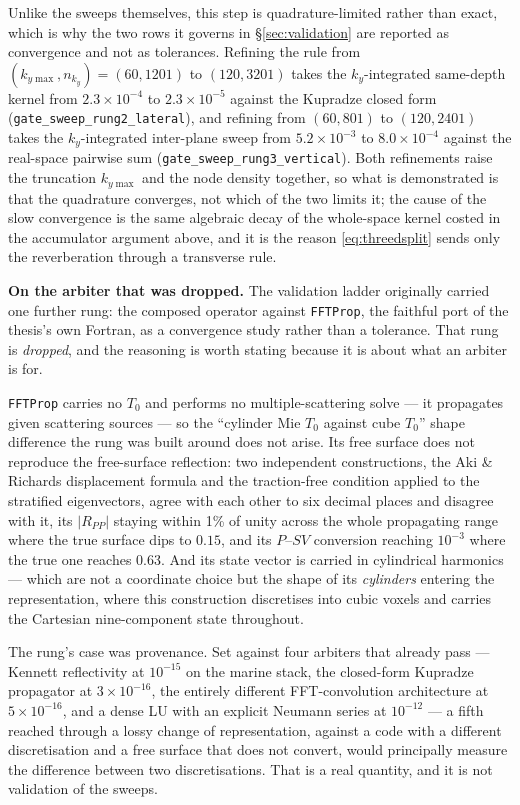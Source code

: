 \documentclass[11pt,a4paper]{article}
\newcommand{\Tz}{T_0}
\begin{document}
Unlike the sweeps themselves, this step is quadrature-limited rather than exact, which is why the
two rows it governs in \S\ref{sec:validation} are reported as convergence and not as tolerances.
Refining the rule from $(k_{y\max}, n_{k_y}) = (60, 1201)$ to $(120, 3201)$ takes the
$k_y$-integrated same-depth kernel from $2.3\times10^{-4}$ to $2.3\times10^{-5}$ against the
Kupradze closed form (\texttt{gate\_sweep\_rung2\_lateral}), and refining from $(60, 801)$ to
$(120, 2401)$ takes the $k_y$-integrated inter-plane sweep from $5.2\times10^{-3}$ to
$8.0\times10^{-4}$ against the real-space pairwise sum
(\texttt{gate\_sweep\_rung3\_vertical}). Both refinements raise the truncation $k_{y\max}$ and
the node density together, so what is demonstrated is that the quadrature converges, not which of
the two limits it; the cause of the slow convergence is the same algebraic decay of the
whole-space kernel costed in the accumulator argument above, and it is the reason
\eqref{eq:threedsplit} sends only the reverberation through a transverse rule.

\medskip\noindent
\textbf{On the arbiter that was dropped.} The validation ladder originally carried one further
rung: the composed operator against \texttt{FFTProp}, the faithful port of the thesis's own
Fortran, as a convergence study rather than a tolerance. That rung is \emph{dropped}, and the
reasoning is worth stating because it is about what an arbiter is for.

\texttt{FFTProp} carries no $\Tz$ and performs no multiple-scattering solve --- it propagates
given scattering sources --- so the ``cylinder Mie $\Tz$ against cube $\Tz$'' shape difference
the rung was built around does not arise. Its free surface does not reproduce the free-surface
reflection: two independent constructions, the Aki \& Richards displacement formula and the
traction-free condition applied to the stratified eigenvectors, agree with each other to six
decimal places and disagree with it, its $|R_{PP}|$ staying within 1\% of unity across the whole
propagating range where the true surface dips to $0.15$, and its $P$--$SV$ conversion reaching
$10^{-3}$ where the true one reaches $0.63$. And its state vector is carried in cylindrical
harmonics --- which are not a coordinate choice but the shape of its \emph{cylinders} entering
the representation, where this construction discretises into cubic voxels and carries the
Cartesian nine-component state throughout.

The rung's case was provenance. Set against four arbiters that already pass --- Kennett
reflectivity at $10^{-15}$ on the marine stack, the closed-form Kupradze propagator at
$3\times10^{-16}$, the entirely different FFT-convolution architecture at $5\times10^{-16}$, and
a dense LU with an explicit Neumann series at $10^{-12}$ --- a fifth reached through a lossy
change of representation, against a code with a different discretisation and a free surface that
does not convert, would principally measure the difference between two discretisations. That is
a real quantity, and it is not validation of the sweeps.
\end{document}
